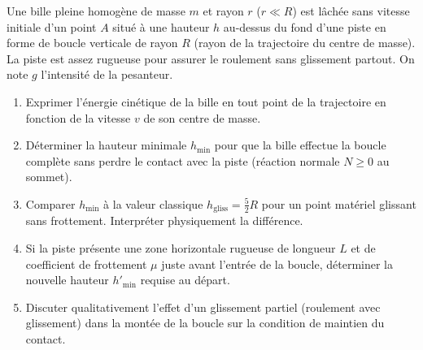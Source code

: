 \documentclass[11pt]{article}
\begin{document}
\begin{exercice}
Une bille pleine homogène de masse $m$ et rayon $r$ ($r \ll R$) est lâchée sans vitesse initiale d'un point $A$ situé à une hauteur $h$ au-dessus du fond d'une piste en forme de boucle verticale de rayon $R$ (rayon de la trajectoire du centre de masse). La piste est assez rugueuse pour assurer le roulement sans glissement partout. On note $g$ l'intensité de la pesanteur.
\begin{enumerate}
    \item Exprimer l'énergie cinétique de la bille en tout point de la trajectoire en fonction de la vitesse $v$ de son centre de masse.
    \item Déterminer la hauteur minimale $h_{\text{min}}$ pour que la bille effectue la boucle complète sans perdre le contact avec la piste (réaction normale $N \ge 0$ au sommet).
    \item Comparer $h_{\text{min}}$ à la valeur classique $h_{\text{gliss}} = \frac{5}{2}R$ pour un point matériel glissant sans frottement. Interpréter physiquement la différence.
    \item Si la piste présente une zone horizontale rugueuse de longueur $L$ et de coefficient de frottement $\mu$ juste avant l'entrée de la boucle, déterminer la nouvelle hauteur $h'_{\text{min}}$ requise au départ.
    \item Discuter qualitativement l'effet d'un glissement partiel (roulement avec glissement) dans la montée de la boucle sur la condition de maintien du contact.
\end{enumerate}
\end{exercice}
\end{document}
